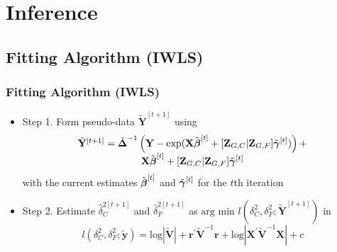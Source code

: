 \documentclass[mathserif,compress]{beamer}
\def\bit{\begin{itemize}}
\def\eit{\end{itemize}}
\def\bdm{\begin{displaymath}}
\def\edm{\end{displaymath}}
\def\br{\mathbf{r}}
\def\by{\mathbf{y}}
\def\bV{\mathbf{V}}
\def\bX{\mathbf{X}}
\def\bY{\mathbf{Y}}
\def\bZ{\mathbf{Z}}
\def\bbeta{\mbox{\boldmath $\beta$}}
\def\bgamma{\mbox{\boldmath $\gamma$}}
\def\bDelta{\mbox{\boldmath $\Delta$}}
\def\log{\textrm{log}}
\def\argmin{\textrm{arg min }}
\begin{document}

\section{Inference}

\subsection{Fitting Algorithm (IWLS)}
\begin{frame} 
\frametitle{Fitting Algorithm (IWLS)}
     
	\begin{center}
	\bit
		\item Step 1.  Form pseudo-data $\tilde{\bY}^{[t+1]}$ using 
			\bdm
				\begin{array}{c}
				\tilde{\bY}^{[t+1]} = \tilde{\bDelta}^{-1}\left(\bY -
				\exp(\bX\tilde{\bbeta}^{[t]} + [\bZ_{G,C}|\bZ_{G,F}]\tilde{\bgamma}^{[t]})\right) + \\
				\bX\tilde{\bbeta}^{[t]}+ [\bZ_{G,C}|\bZ_{G,F}]\tilde{\bgamma}^{[t]}
				\end{array}
			\edm 
		with the current estimates $\tilde{\bbeta}^{[t]}$ and $\tilde{\bgamma}^{[t]}$ 
			for the $t$th iteration \pause
		\item Step 2.  Estimate $\hat{\delta}_C^{2[t+1]}$ and $\hat{\delta}_F^{2[t+1]}$ 
			as $\argmin l(\delta_C^2,\delta_F^2;\tilde{\bY}^{[t+1]})$ in 
			\bdm
				l(\delta_C^2,\delta_F^2;\tilde{\by}) = \log\left|\tilde{\bV}\right| +
				\br^{\prime}\tilde{\bV}^{-1}\br +
				\log\left|\bX^{\prime}\tilde{\bV}^{-1}\bX\right| + c
			\edm
	\eit
	\end{center}

\end{frame}

\end{document}
